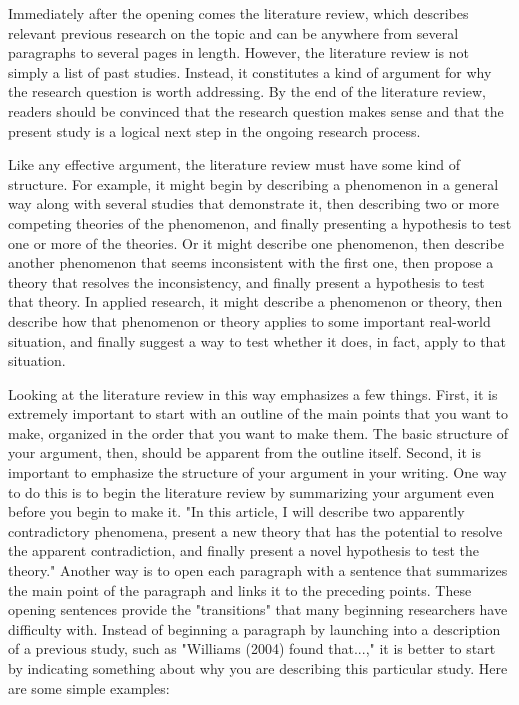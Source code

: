 Immediately after the opening comes the literature review, which describes relevant previous research on the topic and can be anywhere from several paragraphs to several pages in length. However, the literature review is not simply a list of past studies. Instead, it constitutes a kind of argument for why the research question is worth addressing. By the end of the literature review, readers should be convinced that the research question makes sense and that the present study is a logical next step in the ongoing research process.




Like any effective argument, the literature review must have some kind of structure. For example, it might begin by describing a phenomenon in a general way along with several studies that demonstrate it, then describing two or more competing theories of the phenomenon, and finally presenting a hypothesis to test one or more of the theories. Or it might describe one phenomenon, then describe another phenomenon that seems inconsistent with the first one, then propose a theory that resolves the inconsistency, and finally present a hypothesis to test that theory. In applied research, it might describe a phenomenon or theory, then describe how that phenomenon or theory applies to some important real-world situation, and finally suggest a way to test whether it does, in fact, apply to that situation. 



Looking at the literature review in this way emphasizes a few things. First, it is extremely important to start with an outline of the main points that you want to make, organized in the order that you want to make them. The basic structure of your argument, then, should be apparent from the outline itself. Second, it is important to emphasize the structure of your argument in your writing. One way to do this is to begin the literature review by summarizing your argument even before you begin to make it. "In this article, I will describe two apparently contradictory phenomena, present a new theory that has the potential to resolve the apparent contradiction, and finally present a novel hypothesis to test the theory." Another way is to open each paragraph with a sentence that summarizes the main point of the paragraph and links it to the preceding points. These opening sentences provide the "transitions" that many beginning researchers have difficulty with. Instead of beginning a paragraph by launching into a description of a previous study, such as "Williams (2004) found that...," it is better to start by
indicating something about why you are describing this particular study. Here are some simple examples:


